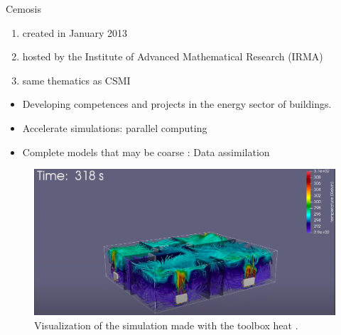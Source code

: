 \documentclass[10pt,xcolor={table,dvipsnames},t]{beamer}
\begin{document}
	\begin{frame}{Cemosis}
		
		\begin{minipage}{0.3\hsize}
			\centering
			\begin{enumerate}[$\rightarrow$]
				\item created in January 2013
				\item hosted by the Institute of Advanced Mathematical Research (IRMA)
				\item same thematics as CSMI
			\end{enumerate}
		\end{minipage} \quad
		\begin{minipage}{0.6\hsize}
			
     \begin{itemize}
        \item Developing
competences and projects in the energy sector of buildings.
\item Accelerate simulations: parallel computing
\item Complete models that may be coarse : Data assimilation
    \end{itemize}
    \begin{figure}
        \centering
        \includegraphics[width=0.65\linewidth]{"images/intro/cemosis_simulation_2.png"}
        \caption{Visualization of the simulation made with the toolbox heat  .}
    \end{figure}
		\end{minipage}
		
	
	\end{frame}
 
\end{document}
